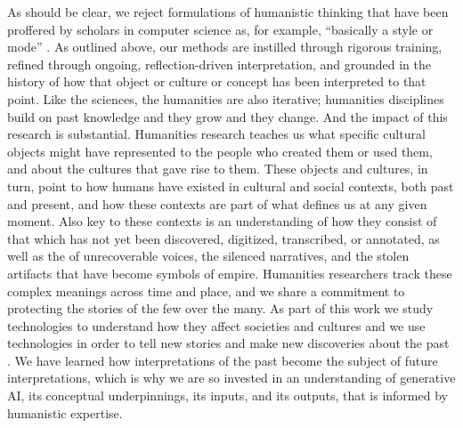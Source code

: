 As should be clear, we reject formulations of humanistic thinking that have been proffered by scholars in computer science as, for example, ``basically a style or mode'' \cite{Bardzell_Bardzell_2015}. As outlined above, our methods are instilled through rigorous training, refined through ongoing, reflection-driven interpretation, and grounded in the history of how that object or culture or concept has been interpreted to that point. Like the sciences, the humanities are also iterative; humanities disciplines build on past knowledge and they grow and they change. And the impact of this research is substantial. Humanities research teaches us what specific cultural objects might have represented to the people who created them or used them, and about the cultures that gave rise to them. These objects and cultures, in turn, point to how humans have existed in cultural and social contexts, both past and present, and how these contexts are part of what defines us at any given moment. Also key to these contexts is an understanding of how they consist of that which has not yet been discovered, digitized, transcribed, or annotated, as well as the of unrecoverable voices, the silenced narratives, and the stolen artifacts that have become symbols of empire. Humanities researchers track these complex meanings across time and place, and we share a commitment to protecting the stories of the few over the many. As part of this work we study technologies to understand how they affect societies and cultures \cite{Hicks_2020, Morgan_2021, Rosenthal_2018, Benjamin_2024} and we use technologies in order to tell new stories and make new discoveries about the past \cite{gallon_chapter_2016}. We have learned how interpretations of the past become the subject of future interpretations, which is why we are so invested in an understanding of generative AI, its conceptual underpinnings, its inputs, and its outputs, that is informed by humanistic expertise. 